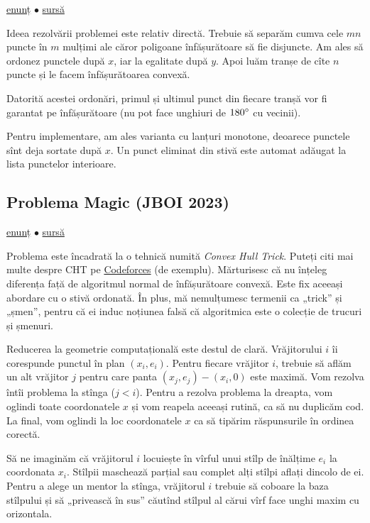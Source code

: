 \documentclass[../main.tex]{subfiles}
\begin{document}
\href{https://kilonova.ro/problems/2227}{enunț}
$\bullet$
\hyperref[code:testament]{sursă}

Ideea rezolvării problemei este relativ directă. Trebuie să separăm cumva cele $mn$ puncte în $m$ mulțimi ale căror poligoane înfășurătoare să fie disjuncte. Am ales să ordonez punctele după $x$, iar la egalitate după $y$. Apoi luăm tranșe de cîte $n$ puncte și le facem înfășurătoarea convexă.

Datorită acestei ordonări, primul și ultimul punct din fiecare tranșă vor fi garantat pe înfășurătoare (nu pot face unghiuri de $180 \degree$ cu vecinii).

Pentru implementare, am ales varianta cu lanțuri monotone, deoarece punctele sînt deja sortate după $x$. Un punct eliminat din stivă este automat adăugat la lista punctelor interioare.


\subsection{Problema Magic (JBOI 2023)}
\label{problem:magic}

\href{https://kilonova.ro/problems/2022}{enunț}
$\bullet$
\hyperref[code:magic]{sursă}

Problema este încadrată la o tehnică numită \textit{Convex Hull Trick}. Puteți citi mai multe despre CHT pe \href{https://codeforces.com/blog/entry/63823}{Codeforces} (de exemplu). Mărturisesc că nu înțeleg diferența față de algoritmul normal de înfășurătoare convexă. Este fix aceeași abordare cu o stivă ordonată. În plus, mă nemulțumesc termenii ca „trick” și „șmen”, pentru că ei induc noțiunea falsă că algoritmica este o colecție de trucuri și șmenuri.

Reducerea la geometrie computațională este destul de clară. Vrăjitorului $i$ îi corespunde punctul în plan $(x_i, e_i)$. Pentru fiecare vrăjitor $i$, trebuie să aflăm un alt vrăjitor $j$ pentru care panta $(x_j, e_j)-(x_i, 0)$ este maximă. Vom rezolva întîi problema la stînga ($j < i$). Pentru a rezolva problema la dreapta, vom oglindi toate coordonatele $x$ și vom reapela aceeași rutină, ca să nu duplicăm cod. La final, vom oglindi la loc coordonatele $x$ ca să tipărim răspunsurile în ordinea corectă.

Să ne imaginăm că vrăjitorul $i$ locuiește în vîrful unui stîlp de înălțime $e_i$ la coordonata $x_i$. Stîlpii maschează parțial sau complet alți stîlpi aflați dincolo de ei. Pentru a alege un mentor la stînga, vrăjitorul $i$ trebuie să coboare la baza stîlpului și să „privească în sus” căutînd stîlpul al cărui vîrf face unghi maxim cu orizontala.
\end{document}
